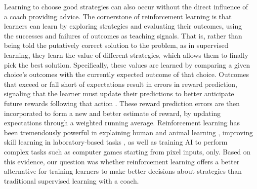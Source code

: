 \documentclass[pdflatex,sn-nature]{sn-jnl}%
\theoremstyle{thmstyleone}%
\theoremstyle{thmstyletwo}%
\theoremstyle{thmstylethree}%
\begin{document}
Learning to choose good strategies can also occur without the direct influence of a coach providing advice. The cornerstone of reinforcement learning \cite{sutton_reinforcement_2018} is that learners can learn by exploring strategies and evaluating their outcomes, using the successes and failures of outcomes as teaching signals. That is, rather than being told the putatively correct solution to the problem, as in supervised learning, they learn the value of different strategies, which allows them to finally pick the best solution. Specifically, these values are learned by comparing a given choice's outcomes with the currently expected outcome of that choice. Outcomes that exceed or fall short of expectations result in errors in reward prediction, signaling that the learner must update their predictions to better anticipate future rewards following that action \cite{rescorla_theory_1972}. These reward prediction errors are then incorporated to form a new and better estimate of reward, by updating expectations through a weighted running average. Reinforcement learning has been tremendously powerful in explaining human and animal learning \cite{waelti_dopamine_2001, schultz_neural_1997, pessiglione_dopamine-dependent_2006,lee_neural_2012}, improving skill learning in laboratory-based tasks \cite{lior_shmuelof_overcoming_2012, abe_reward_2011, truong_error-based_2023, hasson_reinforcement_2015}, as well as training AI to perform complex tasks such as computer games starting from pixel inputs, only\cite{mnih_human-level_2015}. Based on this evidence, our question was whether reinforcement learning offers a better alternative for training learners to make better decisions about strategies than traditional supervised learning with a coach. 
\end{document}
